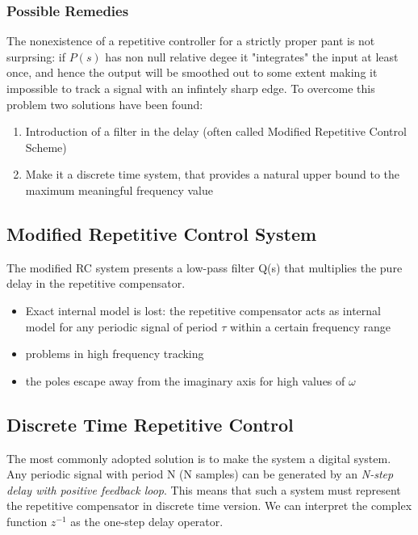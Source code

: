 \documentclass{book}
\begin{document}
\subsubsection{Possible Remedies}
The nonexistence of a repetitive controller for a strictly proper pant is not surprsing: if $P(s)$ has non null relative degee it "integrates" the input at least once, and hence the output will be smoothed out to some extent making it impossible to track a signal with an infintely sharp edge. To overcome this problem two solutions have been found:
\begin{enumerate}
    \item Introduction of a filter in the delay (often called Modified Repetitive Control Scheme)
    \item Make it a discrete time system, that provides a natural upper bound to the maximum meaningful frequency value 
\end{enumerate}
\subsection{Modified Repetitive Control System}
The modified RC system presents a low-pass filter Q(s) that multiplies the pure delay in the repetitive compensator. 
\begin{itemize}
    \item Exact internal model is lost: the repetitive compensator acts as internal model for any periodic signal of period $\tau$ within a certain frequency range 
    \item problems in high frequency tracking 
    \item the poles escape away from the imaginary axis for high values of $\omega$ 
\end{itemize}

\subsection{Discrete Time Repetitive Control}
The most commonly adopted solution is to make the system a digital system. Any periodic signal with period N (N samples) can be generated by an \emph{N-step delay with positive feedback loop}. This means that such a system must represent the repetitive compensator in discrete time version. We can interpret the complex function $z^{-1}$ as the one-step delay operator. 
\end{document}
